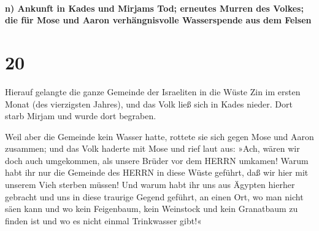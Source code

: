 \hypertarget{n-ankunft-in-kades-und-mirjams-tod-erneutes-murren-des-volkes-die-fuxfcr-mose-und-aaron-verhuxe4ngnisvolle-wasserspende-aus-dem-felsen}{%
\paragraph{n) Ankunft in Kades und Mirjams Tod; erneutes Murren des
Volkes; die für Mose und Aaron verhängnisvolle Wasserspende aus dem
Felsen}\label{n-ankunft-in-kades-und-mirjams-tod-erneutes-murren-des-volkes-die-fuxfcr-mose-und-aaron-verhuxe4ngnisvolle-wasserspende-aus-dem-felsen}}

\hypertarget{section-19}{%
\section{20}\label{section-19}}

Hierauf gelangte die ganze Gemeinde der Israeliten in die
Wüste Zin im ersten Monat (des vierzigsten Jahres), und das Volk ließ
sich in Kades nieder. Dort starb Mirjam und wurde dort begraben.

Weil aber die Gemeinde kein Wasser hatte, rottete sie sich
gegen Mose und Aaron zusammen; und das Volk haderte mit
Mose und rief laut aus: »Ach, wären wir doch auch umgekommen, als unsere
Brüder vor dem HERRN umkamen! Warum habt ihr nur die
Gemeinde des HERRN in diese Wüste geführt, daß wir hier mit unserem Vieh
sterben müssen! Und warum habt ihr uns aus Ägypten hierher
gebracht und uns in diese traurige Gegend geführt, an einen Ort, wo man
nicht säen kann und wo kein Feigenbaum, kein Weinstock und kein
Granatbaum zu finden ist und wo es nicht einmal Trinkwasser gibt!«

